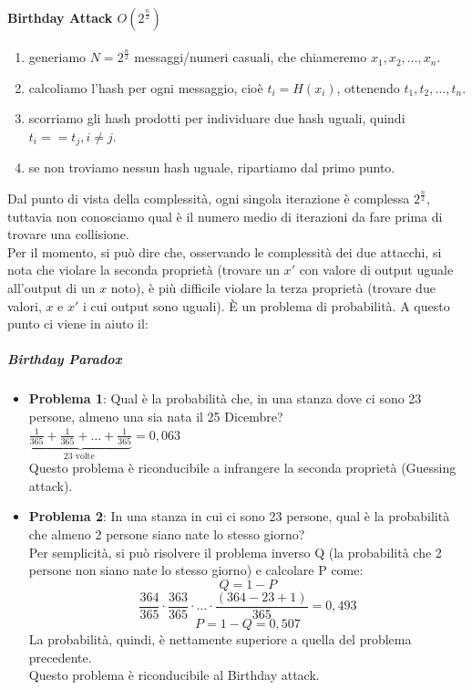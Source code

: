 \documentclass[a4paper,12pt]{article}
\begin{document}
\paragraph{Birthday Attack $O\left(2^{\frac{n}{2}}\right)$}
\begin{enumerate}
	\item generiamo $N = 2^{\frac{n}{2}}$ messaggi/numeri casuali, che chiameremo $x_1, x_2, \ldots , x_n$.
	\item calcoliamo l'hash per ogni messaggio, cioè $t_i = H(x_i)$, ottenendo $t_1, t_2, \ldots , t_n$.
	\item scorriamo gli hash prodotti per individuare due hash uguali, quindi $t_i == t_j, i \neq j$.
	\item se non troviamo nessun hash uguale, ripartiamo dal primo punto.
\end{enumerate}
Dal punto di vista della complessità, ogni singola iterazione è complessa $2^{\frac{n}{2}}$, tuttavia non conosciamo qual è il numero medio di iterazioni da fare prima di trovare una collisione. \\
Per il momento, si può dire che, osservando le complessità dei due attacchi, si nota che violare la seconda proprietà (trovare un $x'$ con valore di output uguale all'output di un $x$ noto), è più difficile violare la terza proprietà (trovare due valori, $x$ e $x'$ i cui output sono uguali). È un problema di probabilità. 
A questo punto ci viene in aiuto il:

\subparagraph{Birthday Paradox}
\begin{itemize}
	\item \textbf{Problema 1}: Qual è la probabilità che, in una stanza dove ci sono 23 persone, almeno una sia nata il 25 Dicembre? \\
	$\underbrace{\frac{1}{365}+\frac{1}{365}+\ldots+\frac{1}{365}}_{23 \text { volte }}=0,063$ \\
	Questo problema è riconducibile a infrangere la seconda proprietà (Guessing attack).
	\item \textbf{Problema 2}: In una stanza in cui ci sono 23 persone, qual è la probabilità che almeno 2 persone siano nate lo stesso giorno? \\
	Per semplicità, si può risolvere il problema inverso Q (la probabilità che 2 persone non siano nate lo stesso giorno) e calcolare P come:
	$$ Q = 1 - P $$ 
	$$\frac{364}{365} \cdot \frac{363}{365} \cdot \ldots \cdot \frac{(364-23+1)}{365}=0,493$$
	$$ P = 1 - Q = 0,507 $$
	La probabilità, quindi, è nettamente superiore a quella del problema precedente. \\
	Questo problema è riconducibile al Birthday attack.
\end{itemize}
\end{document}
